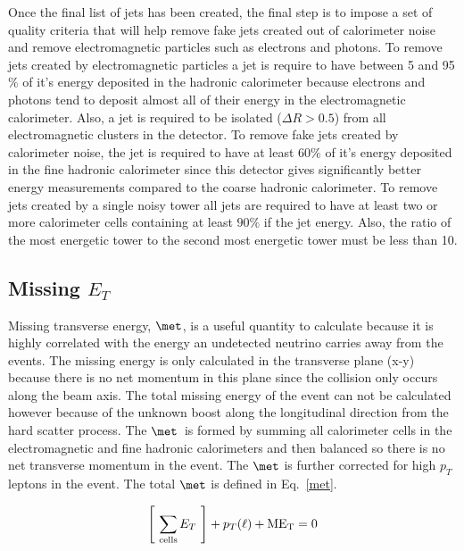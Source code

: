Once the final list of jets has been created, the final step is to impose a set of quality criteria that will help remove fake jets created out of calorimeter noise and remove electromagnetic particles such as electrons and photons. To remove jets created by electromagnetic particles a jet is require to have between 5 and 95$\%$ of it's energy deposited in the hadronic calorimeter because electrons and photons tend to deposit almost all of their energy in the electromagnetic calorimeter. Also, a jet is required to be isolated ($\Delta R>0.5$) from all electromagnetic clusters in the detector. To remove fake jets created by calorimeter noise, the jet is required to have at least 60$\%$ of it's energy deposited in the fine hadronic calorimeter since this detector gives significantly better energy measurements compared to the coarse hadronic calorimeter. To remove jets created by a single noisy tower all jets are required to have at least two or more calorimeter cells containing at least $90\%$ if the jet energy. Also, the ratio of the most energetic tower to the second most energetic tower must be less than 10. 

\subsection{Missing $E_{T}$}
Missing transverse energy, $\met$, is a useful quantity to calculate because it is highly correlated with the energy an undetected neutrino carries away from the events. The missing energy is only calculated in the transverse plane (x-y) because there is no net momentum in this plane since the collision only occurs along the beam axis. The total missing energy of the event can not be calculated however because of the unknown boost along the longitudinal direction from the hard scatter process.  The $\met$~is formed by summing all calorimeter cells in the electromagnetic and fine hadronic calorimeters and then balanced so there is no net transverse momentum in the event. The $\met$ is further corrected for high $p_{T}$ leptons in the event. The total $\met$ is defined in Eq.~\ref{met}.

\begin{equation}
\label{met}
\left[~\sum_{\rm{cells}} E_{T}~\right]+ p_{T}(\ell) + \rm{ME}_{T} = 0
\end{equation}


